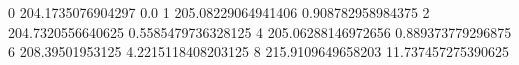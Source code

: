 0 204.1735076904297 0.0
1 205.08229064941406 0.908782958984375
2 204.7320556640625 0.5585479736328125
4 205.06288146972656 0.889373779296875
6 208.39501953125 4.2215118408203125
8 215.9109649658203 11.737457275390625
